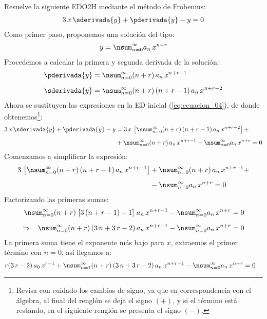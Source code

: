 Resuelve la siguiente EDO2H mediante el método de Frobenius:
\begin{align}
3 \, x \, \sderivada{y} + \pderivada{y} - y = 0
\label{eq:ecuacion_04}    
\end{align}
Como primer paso, proponemos una solución del tipo:
\begin{align*}
y = \nsum_{n=0}^{\infty} a_{n} \, x^{n+r}
\end{align*}
Procedemos a calcular la primera y segunda derivada de la solución:
\begin{align*}
\pderivada{y} &= \nsum_{n=0}^{\infty} (n + r) \, a_{n} \, x^{n+r-1} \\[0.5em]
\sderivada{y} &= \nsum_{n=0}^{\infty} (n + r) \, (n + r - 1) \, a_{n} \, x^{n+r-2}
\end{align*}
Ahora se sustituyen las expresiones en la ED inicial (\ref{eq:ecuacion_04}), de donde obtenemos\footnote{Revisa con cuidado los cambios de signo, ya que en correspondencia con el álgebra, al final del renglón se deja el signo $(+)$, y si el término está restando, en el siguiente renglón se presenta el signo $(-)$.}:
\begin{align*}
3 \, x \, \sderivada{y} + \pderivada{y} - y &= 3 \, x \, \left[  \nsum_{n=0}^{\infty} (n + r) \, (n + r - 1) \, a_{n} \, x^{n+r-2} \right] + \\[0.5em]
&+ \nsum_{n=0}^{\infty} (n + r) \, a_{n} \, x^{n+r-1} - \nsum_{n=0}^{\infty} a_{n} \, x^{n+r} = 0
\end{align*}
Comenzamos a simplificar la expresión:
\begin{align*}
3 \, \left[  \nsum_{n=0}^{\infty} (n + r) \, (n + r - 1) \, a_{n} \, x^{n+r-1} \right] &+ \nsum_{n=0}^{\infty} (n + r) \, a_{n} \, x^{n+r-1} + \\[0.5em]
&- \nsum_{n=0}^{\infty} a_{n} \, x^{n+r} = 0
\end{align*}
Factorizando las primeras sumas:
\begin{align*}
\nsum_{n=0}^{\infty} (n + r) \, \left[ 3 \, (n + r - 1) + 1 \right] \, a_{n} \, x^{n+r-1} - \nsum_{n=0}^{\infty} a_{n} \, x^{n+r} &= 0 \\[0.5em] 
\Rightarrow \hspace{0.3cm} \nsum_{n=0}^{\infty} (n + r) \, (3 \, n + 3 \, r - 2) \, a_{n} \, x^{n+r-1} - \nsum_{n=0}^{\infty} a_{n} \, x^{n+r} &= 0
\end{align*}
La primera suma tiene el exponente más bajo para $x$, extraemos el primer término con $n = 0$, así llegamos a:
\begin{align*}
r( 3 \, r - 2) \, a_{0} \, x^{r-1} + \nsum_{n=1}^{\infty} (n + r) \, (3 \, n + 3 \, r - 2) \, a_{n} \, x^{n+r-1} - \nsum_{n=0}^{\infty} a_{n} \, x^{n+r} &= 0
\end{align*}
